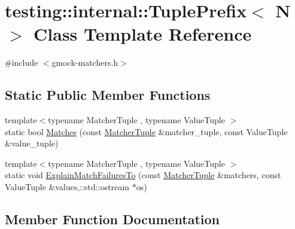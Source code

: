 \hypertarget{classtesting_1_1internal_1_1_tuple_prefix}{}\section{testing\+:\+:internal\+:\+:Tuple\+Prefix$<$ N $>$ Class Template Reference}
\label{classtesting_1_1internal_1_1_tuple_prefix}


{\ttfamily \#include $<$gmock-\/matchers.\+h$>$}

\subsection*{Static Public Member Functions}
\begin{DoxyCompactItemize}
\item 
{\footnotesize template$<$typename Matcher\+Tuple , typename Value\+Tuple $>$ }\\static bool \hyperlink{classtesting_1_1internal_1_1_tuple_prefix_ada24ceee73c02e3bb7f8264143170f7a}{Matches} (const \hyperlink{structtesting_1_1internal_1_1_matcher_tuple}{Matcher\+Tuple} \&matcher\+\_\+tuple, const Value\+Tuple \&value\+\_\+tuple)
\item 
{\footnotesize template$<$typename Matcher\+Tuple , typename Value\+Tuple $>$ }\\static void \hyperlink{classtesting_1_1internal_1_1_tuple_prefix_af983f3f9254408e6dabe67b511dd22ae}{Explain\+Match\+Failures\+To} (const \hyperlink{structtesting_1_1internal_1_1_matcher_tuple}{Matcher\+Tuple} \&matchers, const Value\+Tuple \&values,\+::std\+::ostream $\ast$os)
\end{DoxyCompactItemize}


\subsection{Member Function Documentation}
